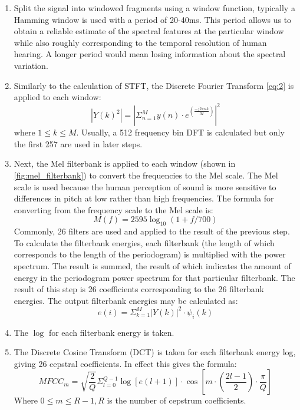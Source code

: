 \documentclass[a4paper, 12pt, twoside]{report}
\begin{document}
\begin{enumerate}
    \item Split the signal into windowed fragments using a window function, typically a Hamming window is used \cite{Chakroborty2006FusionOA} with a period of 20-40ms. This period allows us to obtain a reliable estimate of the spectral features at the particular window while also roughly corresponding to the temporal resolution of human hearing. A longer period would mean losing information about the spectral variation.
  \item Similarly to the calculation of STFT, the Discrete Fourier Transform \ref{eq:2} is applied to each window:
\[ |Y(k)^{2}| = | \Sigma^{M}_{n=1}y(n)\cdot e^{(\frac{-j2\pi nk}{M})}|^{2} \]
        where $1 \leq k \leq M$.
        Usually, a 512 frequency bin DFT is calculated but only the first 257 are used in later steps.
    \item Next, the Mel filterbank is applied to each window (shown in \ref{fig:mel_filterbank}) to convert the frequencies to the Mel scale. The Mel scale is used because the human perception of sound is more sensitive to differences in pitch at low rather than high frequencies. The formula for converting from the frequency scale to the Mel scale is:
        \[ M(f) = 2595 \log_{10} (1+f/700)\]
    Commonly, 26 filters are used and applied to the result of the previous step. To calculate the filterbank energies, each filterbank (the length of which corresponds to the length of the periodogram) is multiplied with the power spectrum. The result is summed, the result of which indicates the amount of energy in the periodogram power spectrum for that particular filterbank. The result of this step is 26 coefficients corresponding to the 26 filterbank energies.
        The output filterbank energies may be calculated as:
        \[ e(i) = \Sigma^{M}_{k=1}|Y(k)|^{2}\cdot \psi_{i}(k) \]

  \item The $\log$ for each filterbank energy is taken.
    \item The Discrete Cosine Transform (DCT) is taken for each filterbank energy log, giving 26 cepstral coefficients.
    In effect this gives the formula:
        \[ MFCC_{m} = \sqrt{\frac{2}{Q}} \Sigma^{Q-1}_{l=0}\log [e(l + 1)]\cdot \cos \left[m \cdot (\frac{2l-1}{2})\cdot \frac{\pi }{Q} \right] \]
        Where $0 \leq m \leq R - 1, R$ is the number of cepstrum coefficients.
\end{enumerate}
\end{document}
